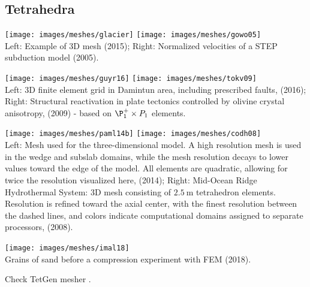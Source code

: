 \subsection{Tetrahedra}

\begin{center}
\texttt{[image: images/meshes/glacier]}
\texttt{[image: images/meshes/gowo05]}\\
{\captionfont 
Left: Example of 3D mesh \textcite{yash15} (2015);
Right: Normalized velocities of a STEP subduction model \textcite{gowo05} (2005).
}
\end{center}

\begin{center}
\texttt{[image: images/meshes/guyr16]}
\texttt{[image: images/meshes/tokv09]}\\
{\captionfont 
Left: 3D finite element grid in Damintun area, including prescribed faults, \textcite{guyr16} (2016);
Right: Structural reactivation in plate tectonics controlled by olivine 
crystal anisotropy, \textcite{tokv09} (2009) - based on $\P_1^+\times P_1$ elements.
}
\end{center}

\begin{center}
\texttt{[image: images/meshes/paml14b]}
\texttt{[image: images/meshes/codh08]}\\
{\captionfont 
Left: Mesh used for the three-dimensional model. A high resolution mesh is used in
the wedge and subslab domains, while the mesh resolution decays to lower values
toward the edge of the model. All elements are quadratic, allowing for twice the
resolution visualized here, \textcite{paml14b} (2014);
Right: Mid-Ocean Ridge Hydrothermal System: 3D mesh consisting of $2.5~\si{\meter}$ tetrahedron elements. 
Resolution is refined toward the axial center, with the finest resolution between the dashed
lines, and colors indicate computational domains assigned to separate processors, 
\textcite{codh08} (2008).}
\end{center}

\begin{center}
\texttt{[image: images/meshes/imal18]}\\
{\captionfont Grains of sand before a compression experiment with FEM \textcite{imal18} (2018).}
\end{center}

Check TetGen mesher . 

